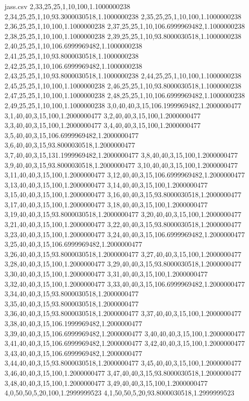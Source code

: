 \begin{filecontents*}{jass.csv}
2,33,25,25,1,10,100,1.1000000238
2,34,25,25,1,10,93.3000030518,1.1000000238
2,35,25,25,1,10,100,1.1000000238
2,36,25,25,1,10,100,1.1000000238
2,37,25,25,1,10,106.6999969482,1.1000000238
2,38,25,25,1,10,100,1.1000000238
2,39,25,25,1,10,93.8000030518,1.1000000238
2,40,25,25,1,10,106.6999969482,1.1000000238
2,41,25,25,1,10,93.8000030518,1.1000000238
2,42,25,25,1,10,106.6999969482,1.1000000238
2,43,25,25,1,10,93.8000030518,1.1000000238
2,44,25,25,1,10,100,1.1000000238
2,45,25,25,1,10,100,1.1000000238
2,46,25,25,1,10,93.8000030518,1.1000000238
2,47,25,25,1,10,100,1.1000000238
2,48,25,25,1,10,106.6999969482,1.1000000238
2,49,25,25,1,10,100,1.1000000238
3,0,40,40,3,15,106.1999969482,1.2000000477
3,1,40,40,3,15,100,1.2000000477
3,2,40,40,3,15,100,1.2000000477
3,3,40,40,3,15,100,1.2000000477
3,4,40,40,3,15,100,1.2000000477
3,5,40,40,3,15,106.6999969482,1.2000000477
3,6,40,40,3,15,93.8000030518,1.2000000477
3,7,40,40,3,15,131.1999969482,1.2000000477
3,8,40,40,3,15,100,1.2000000477
3,9,40,40,3,15,93.8000030518,1.2000000477
3,10,40,40,3,15,100,1.2000000477
3,11,40,40,3,15,100,1.2000000477
3,12,40,40,3,15,106.6999969482,1.2000000477
3,13,40,40,3,15,100,1.2000000477
3,14,40,40,3,15,100,1.2000000477
3,15,40,40,3,15,100,1.2000000477
3,16,40,40,3,15,93.8000030518,1.2000000477
3,17,40,40,3,15,100,1.2000000477
3,18,40,40,3,15,100,1.2000000477
3,19,40,40,3,15,93.8000030518,1.2000000477
3,20,40,40,3,15,100,1.2000000477
3,21,40,40,3,15,100,1.2000000477
3,22,40,40,3,15,93.8000030518,1.2000000477
3,23,40,40,3,15,100,1.2000000477
3,24,40,40,3,15,106.6999969482,1.2000000477
3,25,40,40,3,15,106.6999969482,1.2000000477
3,26,40,40,3,15,93.8000030518,1.2000000477
3,27,40,40,3,15,100,1.2000000477
3,28,40,40,3,15,100,1.2000000477
3,29,40,40,3,15,93.8000030518,1.2000000477
3,30,40,40,3,15,100,1.2000000477
3,31,40,40,3,15,100,1.2000000477
3,32,40,40,3,15,100,1.2000000477
3,33,40,40,3,15,106.6999969482,1.2000000477
3,34,40,40,3,15,93.8000030518,1.2000000477
3,35,40,40,3,15,93.8000030518,1.2000000477
3,36,40,40,3,15,93.8000030518,1.2000000477
3,37,40,40,3,15,100,1.2000000477
3,38,40,40,3,15,106.1999969482,1.2000000477
3,39,40,40,3,15,106.6999969482,1.2000000477
3,40,40,40,3,15,100,1.2000000477
3,41,40,40,3,15,106.6999969482,1.2000000477
3,42,40,40,3,15,100,1.2000000477
3,43,40,40,3,15,106.6999969482,1.2000000477
3,44,40,40,3,15,93.8000030518,1.2000000477
3,45,40,40,3,15,100,1.2000000477
3,46,40,40,3,15,100,1.2000000477
3,47,40,40,3,15,93.8000030518,1.2000000477
3,48,40,40,3,15,100,1.2000000477
3,49,40,40,3,15,100,1.2000000477
4,0,50,50,5,20,100,1.2999999523
4,1,50,50,5,20,93.8000030518,1.2999999523

\end{filecontents*}
